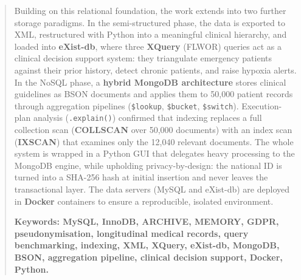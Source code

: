 \documentclass[../main.tex]{subfiles}
\begin{document}
\begin{abstract}
Building on this relational foundation, the work extends into two further storage paradigms. In the semi-structured phase, the data is exported to XML, restructured with Python into a meaningful clinical hierarchy, and loaded into \textbf{eXist-db}, where three \textbf{XQuery} (FLWOR) queries act as a clinical decision support system: they triangulate emergency patients against their prior history, detect chronic patients, and raise hypoxia alerts. In the NoSQL phase, a \textbf{hybrid MongoDB architecture} stores clinical guidelines as BSON documents and applies them to 50,000 patient records through aggregation pipelines (\texttt{\$lookup}, \texttt{\$bucket}, \texttt{\$switch}). Execution-plan analysis (\texttt{.explain()}) confirmed that indexing replaces a full collection scan (\textbf{COLLSCAN} over 50,000 documents) with an index scan (\textbf{IXSCAN}) that examines only the 12,040 relevant documents. The whole system is wrapped in a Python GUI that delegates heavy processing to the MongoDB engine, while upholding privacy-by-design: the national ID is turned into a SHA-256 hash at initial insertion and never leaves the transactional layer. The data servers (MySQL and eXist-db) are deployed in \textbf{Docker} containers to ensure a reproducible, isolated environment.

\bigskip
\noindent\bfseries{\large{Keywords:}} MySQL, InnoDB, ARCHIVE, MEMORY, GDPR, pseudonymisation, longitudinal medical records, query benchmarking, indexing, XML, XQuery, eXist-db, MongoDB, BSON, aggregation pipeline, clinical decision support, Docker, Python.

\end{abstract}
\end{document}
